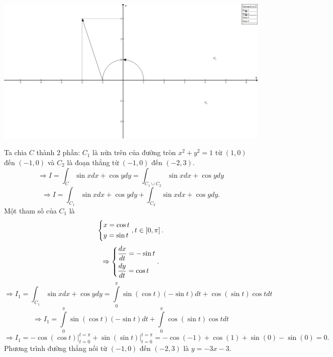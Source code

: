 \documentclass[12pt,a4paper]{article}
\begin{document}
\begin{center}
	\includegraphics[scale=0.3]{c4_5}
\end{center}
Ta chia \(C\) thành \(2\) phần: \(C_1\) là nửa trên của đường tròn \({x^2} + {y^2} = 1\) từ \(\left( {1,0} \right)\) đến \(\left( { - 1,0} \right)\) và \(C_2\) là đoạn thẳng từ \(\left( { - 1,0} \right)\) đến \(\left( { - 2,3} \right).\)
\[ \Rightarrow I = \int_C {\sin xdx + \cos ydy}  = \int_{{C_1} \cup {C_2}} {\sin xdx + \cos ydy} \]
\[ \Rightarrow I = \int_{{C_1}} {\sin xdx + \cos ydy}  + \int_{{C_2}} {\sin xdx + \cos ydy} .\]
Một tham số của \(C_1\) là
\[\left\{ \begin{gathered}
  x = \cos t \hfill \\
  y = \sin t \hfill \\ 
\end{gathered}  \right.,t \in \left[ {0,\pi } \right].\]
\[ \Rightarrow \left\{ \begin{gathered}
  \frac{{dx}}{{dt}} =  - \sin t \hfill \\
  \frac{{dy}}{{dt}} = \cos t \hfill \\ 
\end{gathered}  \right..\]
\[ \Rightarrow {I_1} = \int_{{C_1}} {\sin xdx + \cos ydy}  = \int\limits_0^\pi  {\sin \left( {\cos t} \right)\left( { - \sin t} \right)} dt + \cos \left( {\sin t} \right)\cos tdt\]
\[ \Rightarrow {I_1} = \int\limits_0^\pi  {\sin \left( {\cos t} \right)\left( { - \sin t} \right)} dt + \int\limits_0^\pi  {\cos \left( {\sin t} \right)\cos tdt} \]
\[ \Rightarrow {I_1} = \left. { - \cos \left( {\cos t} \right)} \right|_{t = 0}^{t = \pi } + \left. {\sin \left( {\sin t} \right)} \right|_{t = 0}^{t = \pi } =  - \cos \left( { - 1} \right) + \cos \left( 1 \right) + \sin \left( 0 \right) - \sin \left( 0 \right) = 0.\]
Phương trình đường thẳng nối từ \(\left( { - 1,0} \right)\) đến \(\left( { - 2,3} \right)\) là \(y = -3x - 3.\)\\
\end{document}
